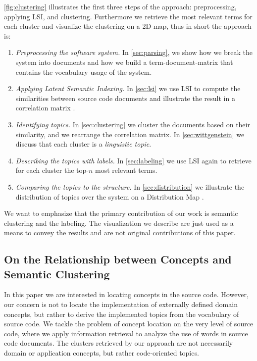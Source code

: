 \autoref{fig:clustering} illustrates the first three steps of the approach: preprocessing, applying LSI, and clustering. Furthermore we retrieve the most relevant terms for each cluster and visualize the clustering on a 2D-map, thus in short the approach is:

\begin{enumerate}
  \item \emph{Preprocessing the software system.} In \autoref{sec:parsing}, we show how we break the system into documents and how we build a term-document-matrix that contains the vocabulary usage of the system.
  \item \emph{Applying Latent Semantic Indexing.} In \autoref{sec:lsi} we use LSI to compute the similarities between source code documents and illustrate the result in a correlation matrix \cite{Ling73a}.
  \item \emph{Identifying topics.} In \autoref{sec:clustering} we cluster the documents based on their similarity, and we rearrange the correlation matrix. In \autoref{sec:wittgenstein} we discuss that each cluster is a \emph{linguistic topic}.
  \item \emph{Describing the topics with labels.} In \autoref{sec:labeling} we use LSI again to retrieve for each cluster the top-$n$ most relevant terms.
  \item \emph{Comparing the topics to the structure.} In \autoref{sec:distribution} we illustrate the distribution of topics over the system on a Distribution Map \cite{Duca06c}.
\end{enumerate}

We want to emphasize that the primary contribution of our work is semantic clustering and the labeling. The visualization we describe are just used as a means to convey the results and are not original contributions of this paper.

\subsection{On the Relationship between Concepts and Semantic Clustering}\label{sec:wittgenstein}

In this paper we are interested in locating concepts in the source code. However, our concern is not to locate the implementation of externally defined domain concepts, but rather to derive the implemented topics from the vocabulary of source code. We tackle the problem of concept location on the very level of source code, where we apply information retrieval to analyze the use of words in source code documents. The clusters retrieved by our approach are not necessarily domain or application concepts, but rather code-oriented topics.

